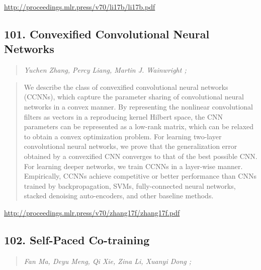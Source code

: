 \documentclass{article}
\begin{document}
\href{http://proceedings.mlr.press/v70/li17b/li17b.pdf}{http://proceedings.mlr.press/v70/li17b/li17b.pdf}

\subsection{101. Convexified Convolutional Neural Networks}

\begin{quote}
\footnotesize{\textit{Yuchen Zhang, Percy Liang, Martin J. Wainwright ;}}

\end{quote}

\begin{quote}
    We describe the class of convexified convolutional neural networks (CCNNs), which capture the parameter sharing of convolutional neural networks in a convex manner. By representing the nonlinear convolutional filters as vectors in a reproducing kernel Hilbert space, the CNN parameters can be represented as a low-rank matrix, which can be relaxed to obtain a convex optimization problem. For learning two-layer convolutional neural networks, we prove that the generalization error obtained by a convexified CNN converges to that of the best possible CNN. For learning deeper networks, we train CCNNs in a layer-wise manner. Empirically, CCNNs achieve competitive or better performance than CNNs trained by backpropagation, SVMs, fully-connected neural networks, stacked denoising auto-encoders, and other baseline methods.  
\end{quote}

\href{http://proceedings.mlr.press/v70/zhang17f/zhang17f.pdf}{http://proceedings.mlr.press/v70/zhang17f/zhang17f.pdf}

\subsection{102. Self-Paced Co-training}

\begin{quote}
\footnotesize{\textit{Fan Ma, Deyu Meng, Qi Xie, Zina Li, Xuanyi Dong ;}}

\end{quote}
\end{document}
